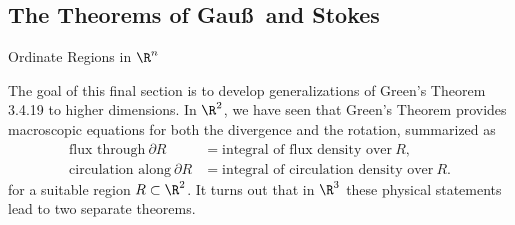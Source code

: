 \documentclass[smaller,hyperref={CJKbookmarks=true}]{beamer}
\begin{document}
\subsection{The Theorems of Gau\ss~and Stokes}
\begin{frame}[c]
\begin{spacing}{2.5}
\tableofcontents[sectionstyle=hide,subsectionstyle=show/shaded/hide]
\end{spacing}
\end{frame}
\begin{frame}[c]{Ordinate Regions in $\R^n$}
\begin{spacing}{1.1}
The goal of this final section is to develop generalizations of Green's
Theorem 3.4.19 to higher dimensions. In $\R^2$, we have seen that Green's
Theorem provides macroscopic equations for both the divergence and the
rotation, summarized as
\begin{align*}
  \text{flux through}~\partial R &=\text{integral of flux density over}~R, \\
  \text{circulation along}~\partial R &=\text{integral of circulation density over}~R.
\end{align*}
for a suitable region $R\subset\R^2$. It turns out that in $\R^3$ these physical statements lead to two separate theorems.
\end{spacing}
\end{frame}
\end{document}
